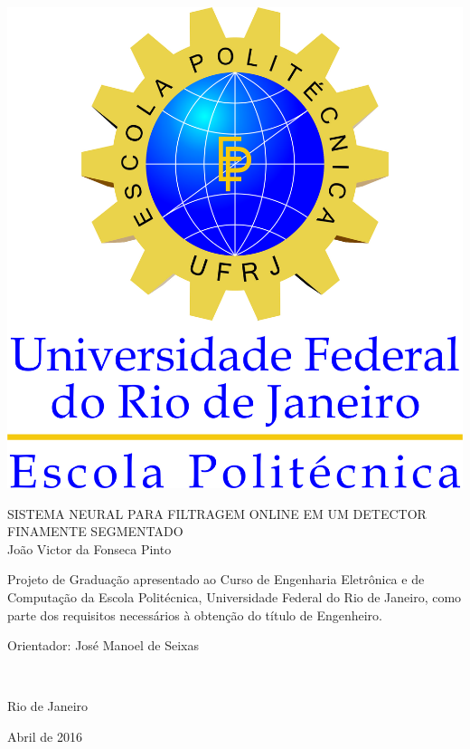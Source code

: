 
\includegraphics[scale=0.18]{figures/logo_poli.jpg}

\begin{center}

\large{SISTEMA NEURAL PARA FILTRAGEM ONLINE EM UM DETECTOR FINAMENTE SEGMENTADO}\\
   \vspace{2cm}
\large{João Victor da Fonseca Pinto}\\
\end{center}
   \vspace{3cm}
\hspace{7cm}
\hfill \parbox{8.0cm}{Projeto de Graduação apresentado ao Curso de Engenharia Eletrônica e de Computação da Escola Politécnica, Universidade Federal do Rio de Janeiro, como parte dos requisitos necessários à obtenção do título de Engenheiro.\\}
   \vspace{2cm}
\hfill \parbox{8.0cm}{Orientador: José Manoel de Seixas} \\
   \vspace{2cm}
\begin{center}
Rio de Janeiro

Abril de 2016
\end{center}




